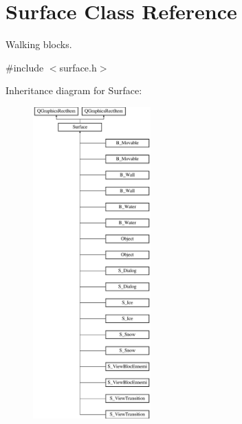\hypertarget{class_surface}{}\section{Surface Class Reference}
\label{class_surface}


Walking blocks.  




{\ttfamily \#include $<$surface.\+h$>$}

Inheritance diagram for Surface\+:\begin{figure}[H]
\begin{center}
\leavevmode
\includegraphics[height=12.000000cm]{class_surface}
\end{center}
\end{figure}
